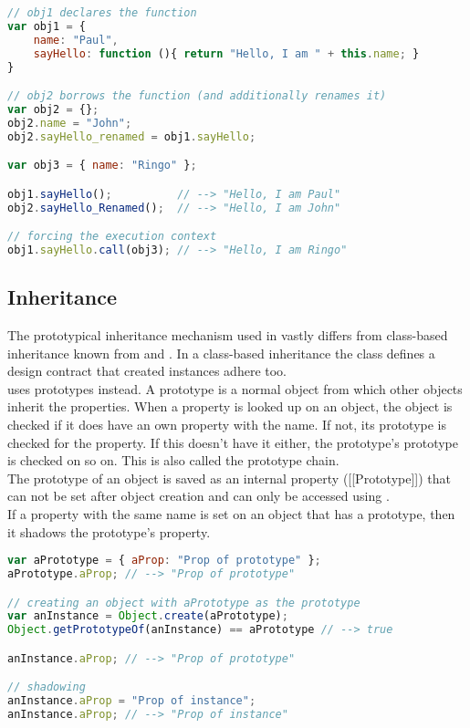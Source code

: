 \SingleSpacing
\begin{lstlisting}[language=JavaScript, caption=Execution context of functions]
// obj1 declares the function
var obj1 = {
	name: "Paul",
	sayHello: function (){ return "Hello, I am " + this.name; }
}

// obj2 borrows the function (and additionally renames it)
var obj2 = {};
obj2.name = "John";
obj2.sayHello_renamed = obj1.sayHello; 

var obj3 = { name: "Ringo" };

obj1.sayHello();          // --> "Hello, I am Paul"
obj2.sayHello_Renamed();  // --> "Hello, I am John"

// forcing the execution context
obj1.sayHello.call(obj3); // --> "Hello, I am Ringo"

\end{lstlisting}
\OnehalfSpacing

\subsection{Inheritance}

The prototypical inheritance mechanism used in  vastly differs from class-based inheritance known from  and . In a class-based inheritance the class defines a design contract that created instances adhere too.\\
 uses prototypes instead. A prototype is a normal  object from which other objects inherit the properties. When a property is looked up on an object, the object is checked if it does have an own property with the name. If not, its prototype is checked for the property. If this doesn't have it either, the prototype's prototype is checked on so on. This is also called the prototype chain.\\
The prototype of an object is saved as an internal property ([[Prototype]]) that can not be set after object creation and can only be accessed using \linebreak{}.\\
If a property with the same name is set on an object that has a prototype, then it shadows the prototype's property.

\SingleSpacing
\begin{lstlisting}[language=JavaScript, caption=Prototypes]
var aPrototype = { aProp: "Prop of prototype" };
aPrototype.aProp; // --> "Prop of prototype"

// creating an object with aPrototype as the prototype
var anInstance = Object.create(aPrototype);
Object.getPrototypeOf(anInstance) == aPrototype // --> true

anInstance.aProp; // --> "Prop of prototype"

// shadowing
anInstance.aProp = "Prop of instance";
anInstance.aProp; // --> "Prop of instance"
\end{lstlisting}
\OnehalfSpacing

